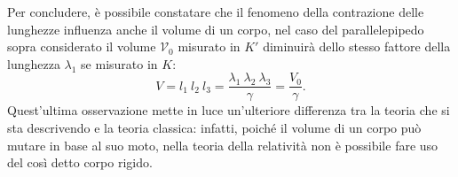  Per concludere, è possibile constatare che il fenomeno della contrazione delle lunghezze influenza anche il volume di un corpo, nel caso del parallelepipedo sopra considerato il volume $\mathcal{V}_0$ misurato in $K'$ diminuirà dello stesso fattore della lunghezza $\lambda_1$ se misurato in $K$:
 \begin{equation}
    V=l_1\ l_2\ l_3=\frac{\lambda_1\ \lambda_2\ \lambda_3}{\gamma}=\frac{V_0}{\gamma}.
    \label{contrazioneVolumi}
 \end{equation}
 Quest'ultima osservazione mette in luce un'ulteriore differenza tra la teoria che si sta descrivendo e la teoria classica: infatti, poiché il volume di un corpo può mutare in base al suo moto, nella teoria della relatività non è possibile fare uso del così detto corpo rigido.
